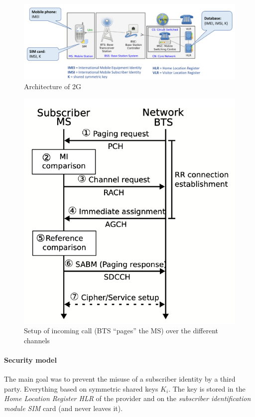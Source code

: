 \begin{figure}[h]
	\centering
	\includegraphics[scale=0.45]{images/10-2g-arch.png}
	\caption{Architecture of 2G}
	\label{fig:2g-arch}
\end{figure}

\begin{figure}[h]
	\centering
	\includegraphics[scale=0.4]{images/10-2g-channels.png}
	\caption{Setup of incoming call (BTS ``pages'' the MS) over the different channels}%
	\label{fig:2g-channels}
\end{figure}

\paragraph{Security model}
The main goal was to prevent the misuse of a subscriber identity by a third
party. Everything based on symmetric shared keys $K_i$. The key is stored in
the \textit{Home Location Register HLR} of the provider and on the
\textit{subscriber identification module SIM} card (and never leaves it).

